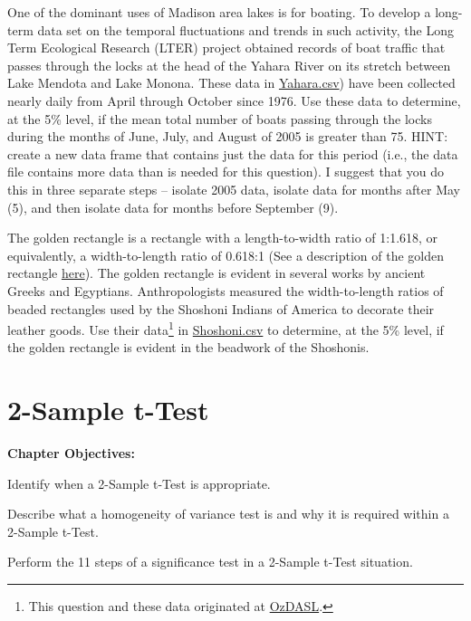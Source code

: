\documentclass[10pt,openany]{book}\usepackage[]{graphicx}\usepackage[]{color}
\begin{document}
\begin{exsection}
  \item \label{revex:tTestYahara1} \rhw{} One of the dominant uses of Madison area lakes is for boating.  To develop a long-term data set on the temporal fluctuations and trends in such activity, the Long Term Ecological Research (LTER) project obtained records of boat traffic that passes through the locks at the head of the Yahara River on its stretch between Lake Mendota and Lake Monona.  These data in \href{https://raw.githubusercontent.com/droglenc/NCData/master/Yahara.csv}{Yahara.csv}) have been collected nearly daily from April through October since 1976.  Use these data to determine, at the 5\% level, if the mean total number of boats passing through the locks during the months of June, July, and August of 2005 is greater than 75.  HINT: create a new data frame that contains just the data for this period (i.e., the data file contains more data than is needed for this question).  I suggest that you do this in three separate steps -- isolate 2005 data, isolate data for months after May (5), and then isolate data for months before September (9). 

  \item \label{revex:tTestBeads} \rhw{} The golden rectangle is a rectangle with a length-to-width ratio of 1:1.618, or equivalently, a width-to-length ratio of 0.618:1 (See a description of the golden rectangle \href{http://en.wikipedia.org/wiki/Golden_rectangle}{here}).  The golden rectangle is evident in several works by ancient Greeks and Egyptians.  Anthropologists measured the width-to-length ratios of beaded rectangles used by the Shoshoni Indians of America to decorate their leather goods.  Use their data\footnote{This question and these data originated at \href{http://www.statsci.org/data/general/shoshoni.html}{OzDASL}.} in \href{https://raw.githubusercontent.com/droglenc/NCData/master/Shoshoni.csv}{Shoshoni.csv} to determine, at the 5\% level, if the golden rectangle is evident in the beadwork of the Shoshonis. 

\end{exsection}



\chapter{2-Sample t-Test} \label{chap:tTest2}
\begin{ChapObj}{\boxwidth}
  \textbf{Chapter Objectives:}
  \begin{Enumerate}
    \item Identify when a 2-Sample t-Test is appropriate.
    \item Describe what a homogeneity of variance test is and why it is required within a 2-Sample t-Test.
    \item Perform the 11 steps of a significance test in a 2-Sample t-Test situation.
  \end{Enumerate}
\end{ChapObj}
\end{document}
